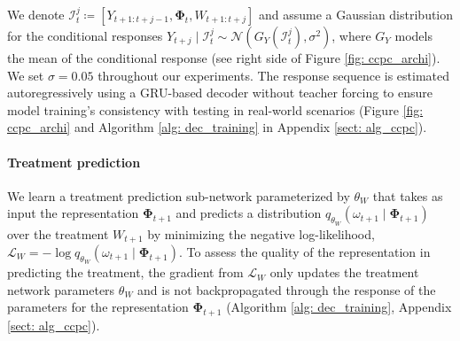 \documentclass{article}
\theoremstyle{plain}
\theoremstyle{definition}
\theoremstyle{remark}
\begin{document}
We denote $\mathcal{I}_t^j \coloneqq [Y_{t+1:t+j-1}, \mathbf{\Phi}_t, W_{t+1:t+j}]$ and assume a Gaussian distribution for the conditional responses $Y_{t+j} \mid \mathcal{I}_t^j \sim \mathcal{N}(G_Y(\mathcal{I}_t^j), \sigma^2)$, where $G_Y$ models the mean of the conditional response (see right side of Figure \ref{fig: ccpc_archi}). We set $\sigma = 0.05$ throughout our experiments. The response sequence is estimated autoregressively using a GRU-based decoder without teacher forcing \citep{williams1989learning} to ensure model training's consistency with testing in real-world scenarios (Figure \ref{fig: ccpc_archi} and Algorithm \ref{alg: dec_training} in Appendix \ref{sect: alg_ccpc}).


\paragraph{Treatment prediction} We learn a treatment prediction sub-network parameterized by $\theta_W$ that takes as input the representation $\mathbf{\Phi}_{t+1}$ and predicts a distribution \( q_{\theta_W}(\omega_{t+1} \mid \mathbf{\Phi}_{t+1}) \) over the treatment \( W_{t+1} \) by minimizing the negative log-likelihood, \( \mathcal{L}_{W} = -\log q_{\theta_W}(\omega_{t+1} \mid \mathbf{\Phi}_{t+1}) \). To assess the quality of the representation in predicting the treatment, the gradient from \( \mathcal{L}_{W} \) only updates the treatment network parameters \( \theta_W \) and is not backpropagated through the response of the parameters for the representation \( \mathbf{\Phi}_{t+1} \) (Algorithm \ref{alg: dec_training}, Appendix \ref{sect: alg_ccpc}).
\end{document}

